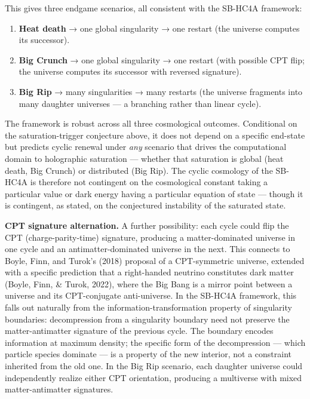 \documentclass[
]{article}
\providecommand{\tightlist}{%
  \setlength{\itemsep}{0pt}\setlength{\parskip}{0pt}}
\begin{document}
This gives three endgame scenarios, all consistent with the SB-HC4A
framework:

\begin{enumerate}
\def\labelenumi{\arabic{enumi}.}
\tightlist
\item
  \textbf{Heat death} → one global singularity → one restart (the
  universe computes its successor).
\item
  \textbf{Big Crunch} → one global singularity → one restart (with
  possible CPT flip; the universe computes its successor with reversed
  signature).
\item
  \textbf{Big Rip} → many singularities → many restarts (the universe
  fragments into many daughter universes --- a branching rather than
  linear cycle).
\end{enumerate}

The framework is robust across all three cosmological outcomes.
Conditional on the saturation-trigger conjecture above, it does not
depend on a specific end-state but predicts cyclic renewal under
\emph{any} scenario that drives the computational domain to holographic
saturation --- whether that saturation is global (heat death, Big
Crunch) or distributed (Big Rip). The cyclic cosmology of the SB-HC4A is
therefore not contingent on the cosmological constant taking a
particular value or dark energy having a particular equation of state
--- though it is contingent, as stated, on the conjectured instability
of the saturated state.

\textbf{CPT signature alternation.} A further possibility: each cycle
could flip the CPT (charge-parity-time) signature, producing a
matter-dominated universe in one cycle and an antimatter-dominated
universe in the next. This connects to Boyle, Finn, and Turok's (2018)
proposal of a CPT-symmetric universe, extended with a specific
prediction that a right-handed neutrino constitutes dark matter (Boyle,
Finn, \& Turok, 2022), where the Big Bang is a mirror point between a
universe and its CPT-conjugate anti-universe. In the SB-HC4A framework,
this falls out naturally from the information-transformation property of
singularity boundaries: decompression from a singularity boundary need
not preserve the matter-antimatter signature of the previous cycle. The
boundary encodes information at maximum density; the specific form of
the decompression --- which particle species dominate --- is a property
of the new interior, not a constraint inherited from the old one. In the
Big Rip scenario, each daughter universe could independently realize
either CPT orientation, producing a multiverse with mixed
matter-antimatter signatures.
\end{document}
